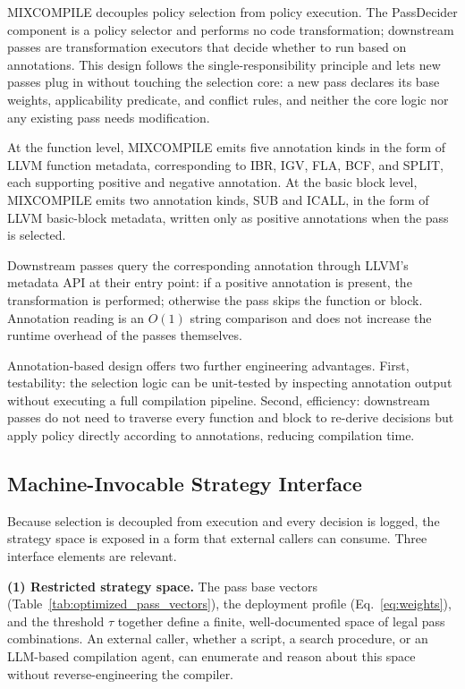 \documentclass[pdflatex,sn-mathphys-num]{sn-jnl}
\theoremstyle{thmstyleone}%
\theoremstyle{thmstyletwo}%
\theoremstyle{thmstylethree}%
\begin{document}
MIXCOMPILE decouples policy selection from policy execution. The PassDecider component
is a policy selector and performs no code transformation; downstream passes are
transformation executors that decide whether to run based on annotations. This design
follows the single-responsibility principle and lets new passes plug in without
touching the selection core: a new pass declares its base weights, applicability
predicate, and conflict rules, and neither the core logic nor any existing pass needs
modification.

At the function level, MIXCOMPILE emits five annotation kinds in the form of LLVM
function metadata, corresponding to IBR, IGV, FLA, BCF, and SPLIT, each supporting
positive and negative annotation. At the basic block level, MIXCOMPILE emits two
annotation kinds, SUB and ICALL, in the form of LLVM basic-block metadata, written only
as positive annotations when the pass is selected.

Downstream passes query the corresponding annotation through LLVM's metadata API at
their entry point: if a positive annotation is present, the transformation is
performed; otherwise the pass skips the function or block. Annotation reading is an
$O(1)$ string comparison and does not increase the runtime overhead of the passes
themselves.

Annotation-based design offers two further engineering advantages. First,
testability: the selection logic can be unit-tested by inspecting annotation
output without executing a full compilation pipeline. Second, efficiency:
downstream passes do not need to traverse every function and block to re-derive
decisions but apply policy directly according to annotations, reducing
compilation time.

\subsection{Machine-Invocable Strategy Interface}
\label{sec:interface}

Because selection is decoupled from execution and every decision is logged, the
strategy space is exposed in a form that external callers can consume. Three interface
elements are relevant.

\textbf{(1) Restricted strategy space.} The pass base vectors
(Table~\ref{tab:optimized_pass_vectors}), the deployment profile
(Eq.~\eqref{eq:weights}), and the threshold $\tau$ together define a finite,
well-documented space of legal pass combinations. An external caller, whether a
script, a search procedure, or an LLM-based compilation agent, can enumerate and
reason about this space without reverse-engineering the compiler.
\end{document}
